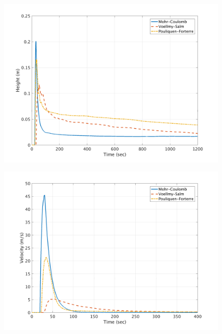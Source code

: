\documentclass[a4paper,10pt]{article}
\begin{document}
\begin{figure}[H]
	\begin{minipage}[b]{0.5\linewidth}
	\centering
    \includegraphics[width=1\textwidth]{HeightMeans/H5All.png}     
        \label{fig:MFHR_L5}
	\end{minipage}
	\begin{minipage}[b]{0.5\linewidth}
	\centering
    \includegraphics[width=1\textwidth]{VelocityMeans/V5All.png}
        \label{fig:MFVR_L5}
	\end{minipage}
	

\end{figure}
\end{document}
